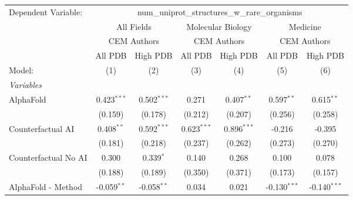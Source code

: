 \begingroup
\centering
\begin{tabular}{lcccccc}
   \tabularnewline \midrule \midrule
   Dependent Variable: & \multicolumn{6}{c}{num\_uniprot\_structures\_w\_rare\_organisms}\\
 & \multicolumn{2}{c}{All Fields} & \multicolumn{2}{c}{Molecular Biology} & \multicolumn{2}{c}{Medicine} \\
\cmidrule(lr){2-3} \cmidrule(lr){4-5} \cmidrule(lr){6-7}
 & \multicolumn{2}{c}{CEM Authors} & \multicolumn{2}{c}{CEM Authors} & \multicolumn{2}{c}{CEM Authors} \\
\cmidrule(lr){2-3} \cmidrule(lr){4-5} \cmidrule(lr){6-7}
 & \multicolumn{1}{c}{All PDB} & \multicolumn{1}{c}{High PDB} & \multicolumn{1}{c}{All PDB} & \multicolumn{1}{c}{High PDB} & \multicolumn{1}{c}{All PDB} & \multicolumn{1}{c}{High PDB} \\
\cmidrule(lr){2-2} \cmidrule(lr){3-3} \cmidrule(lr){4-4} \cmidrule(lr){5-5} \cmidrule(lr){6-6} \cmidrule(lr){7-7}
   Model:                                                     & (1)           & (2)           & (3)            & (4)           & (5)            & (6)\\  
   \midrule
   \emph{Variables}\\
   AlphaFold                                                  & 0.423$^{***}$ & 0.502$^{***}$ & 0.271          & 0.407$^{**}$  & 0.597$^{**}$   & 0.615$^{**}$\\   
                                                              & (0.159)       & (0.178)       & (0.212)        & (0.207)       & (0.256)        & (0.258)\\   
   Counterfactual AI                                          & 0.408$^{**}$  & 0.592$^{***}$ & 0.623$^{***}$  & 0.896$^{***}$ & -0.216         & -0.395\\   
                                                              & (0.181)       & (0.218)       & (0.237)        & (0.262)       & (0.273)        & (0.270)\\   
   Counterfactual No AI                                       & 0.300         & 0.339$^{*}$   & 0.140          & 0.268         & 0.100          & 0.078\\   
                                                              & (0.188)       & (0.189)       & (0.350)        & (0.371)       & (0.173)        & (0.157)\\   
   AlphaFold - Method                                         & -0.059$^{**}$ & -0.058$^{**}$ & 0.034          & 0.021         & -0.130$^{***}$ & -0.140$^{***}$\\   

\end{tabular}
